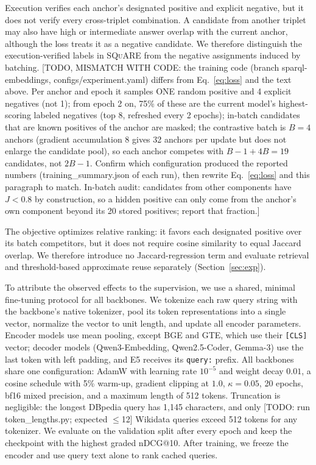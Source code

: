 \documentclass[runningheads]{llncs}
\newcommand{\squareds}{\textsc{SQuARE}}
\newcommand{\hp}[1]{{\color{red!75!black}#1}}
\begin{document}
Execution verifies each anchor's designated positive and explicit
negative, but it does not verify every cross-triplet combination.
A candidate from another triplet may also have high or intermediate
answer overlap with the current anchor, although the loss treats it
as a negative candidate. We therefore distinguish the
execution-verified labels in \squareds{} from the negative assignments
induced by batching.
\hp{[TODO, MISMATCH WITH CODE: the training code (branch
sparql-embeddings, configs/experiment.yaml) differs from Eq.~\ref{eq:loss}
and the text above. Per anchor and epoch it samples ONE random positive and
4 explicit negatives (not 1); from epoch 2 on, 75\% of these are the
current model's highest-scoring labeled negatives (top 8, refreshed every
2 epochs); in-batch candidates that are known positives of the anchor are
masked; the contrastive batch is $B=4$ anchors (gradient accumulation 8
gives 32 anchors per update but does not enlarge the candidate pool), so
each anchor competes with $B-1+4B=19$ candidates, not $2B-1$. Confirm which
configuration produced the reported numbers (training\_summary.json of each
run), then rewrite Eq.~\ref{eq:loss} and this paragraph to match.
In-batch audit: candidates from other components have $J<0.8$ by
construction, so a hidden positive can only come from the anchor's own
component beyond its 20 stored positives; report that fraction.]}

The objective optimizes relative ranking: it favors each designated
positive over its batch competitors, but it does not require cosine
similarity to equal Jaccard overlap. We therefore introduce no
Jaccard-regression term and evaluate retrieval and threshold-based
approximate reuse separately (Section~\ref{sec:exp}).

To attribute the observed effects to the supervision, we use a shared,
minimal fine-tuning protocol for all backbones. We tokenize each raw query
string with the backbone's native tokenizer, pool its token representations
into a single vector, normalize the vector to unit length, and update all
encoder parameters.
Encoder models use mean pooling, except BGE and GTE, which use their
\texttt{[CLS]} vector; decoder models (Qwen3-Embedding, Qwen2.5-Coder,
Gemma-3) use the last token with left padding, and E5 receives its
\texttt{query:} prefix. All backbones share one configuration: AdamW with
learning rate $10^{-5}$ and weight decay $0.01$, a cosine schedule with 5\%
warm-up, gradient clipping at $1.0$, $\kappa = 0.05$, 20 epochs, bf16 mixed
precision, and a maximum length of 512 tokens. Truncation is negligible: the
longest DBpedia query has 1{,}145 characters, and only
\hp{[TODO: run token\_lengths.py; expected $\leq$12]} Wikidata queries exceed
512 tokens for any tokenizer. We evaluate on the validation split after every
epoch and keep the checkpoint with the highest graded nDCG@10.
After training, we freeze the encoder and use query text alone to
rank cached queries.
\end{document}
